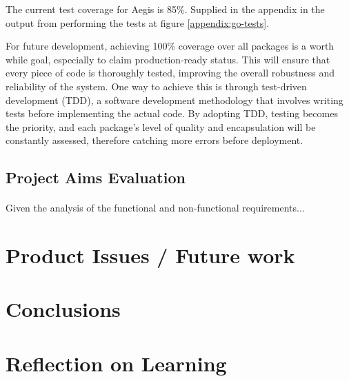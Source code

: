 \documentclass[12pt, conference, final, a4paper, onecolumn, compsoc]{IEEEtran}
\begin{document}
The current test coverage for Aegis is 85\%. Supplied in the appendix in the
output from performing the tests at figure \ref{appendix:go-tests}.

For future development, achieving 100\% coverage over all packages is a worth
while goal, especially to claim production-ready status. This will ensure that
every piece of code is thoroughly tested, improving the overall robustness and
reliability of the system. One way to achieve this is through test-driven
development (TDD), a software development methodology that involves writing
tests before implementing the actual code. By adopting TDD, testing becomes the
priority, and each package's level of quality and encapsulation will be
constantly assessed, therefore catching more errors before deployment.

\subsection{Project Aims Evaluation}
\paragraph{}
Given the analysis of the functional and non-functional requirements...

\section{Product Issues / Future work} %
\subsection{}


\section{Conclusions}
\subsection{}

\section{Reflection on Learning} %
\subsection{}
\end{document}
